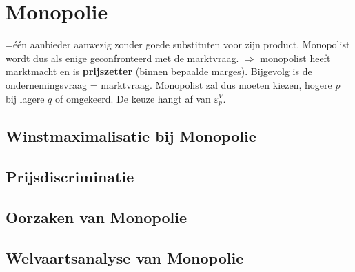 \section{Monopolie}
=\'e\'en aanbieder aanwezig zonder goede substituten voor zijn product. Monopolist wordt dus als enige geconfronteerd met de marktvraag. $\Rightarrow$ monopolist heeft marktmacht en is \textbf{prijszetter} (binnen bepaalde marges). Bijgevolg is de ondernemingsvraag = marktvraag. Monopolist zal dus moeten kiezen, hogere $p$ bij lagere $q$ of omgekeerd. De keuze hangt af van $\varepsilon^V_p$.

\subsection{Winstmaximalisatie bij Monopolie}
\subsection{Prijsdiscriminatie}
\subsection{Oorzaken van Monopolie}
\subsection{Welvaartsanalyse van Monopolie}
